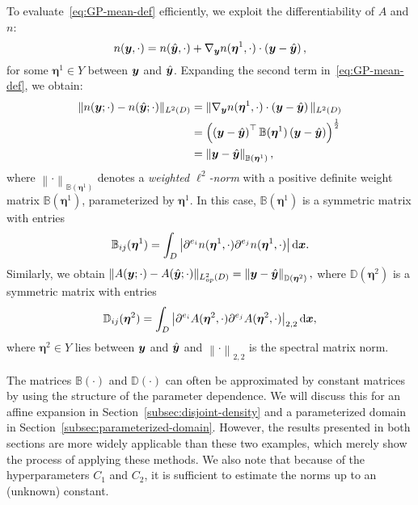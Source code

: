 To evaluate~\eqref{eq:GP-mean-def} efficiently, we exploit the differentiability of $A$ and $n$:
\begin{equation*}
    n({\bm{y}}, \cdot) = n(\hat{\bm{y}}, \cdot) + \nabla_{{\bm{y}}} n(\bm{\eta}^1, \cdot) \cdot \left( {\bm{y}} - \hat{\bm{y}} \right),
\end{equation*}
for some $\bm{\eta}^1\in Y$ between ${\bm{y}}$ and $\hat{\bm{y}}$.
Expanding the second term in~\eqref{eq:GP-mean-def}, we obtain:
\begin{align*}
    \|n({\bm{y}}; \cdot) - n(\hat{{\bm{y}}};\cdot)\|_{L^2(D)}&= \| \nabla_{{\bm{y}}} n(\bm{\eta}^1, \cdot) \cdot \left( {\bm{y}} - \hat{\bm{y}} \right) \|_{L^2(D)}\\
    &= \left( \left({\bm{y}} - \hat{\bm{y}} \right)^\top\mathbb{B}(\bm{\eta}^1)\left({\bm{y}} - \hat{\bm{y}} \right) \right)^{\frac{1}{2}}\\
    &= \left\| {\bm{y}}-\hat{\bm{y}} \right\|_{\mathbb{B}(\bm{\eta}^1)},
\end{align*}
where $\left\| \cdot \right\|_{\mathbb{B}(\bm{\eta}^1)}$ denotes a \emph{weighted $\ell^2$-norm} with a positive definite wei\-ght matrix $\mathbb{B}(\bm{\eta}^1)$, parameterized by $\bm{\eta}^1$.
In this case, $\mathbb{B}(\bm{\eta}^1)$ is a symmetric matrix with entries
\begin{equation}
    \mathbb{B}_{ij}(\bm{\eta}^1) = \int_D \left|  \partial^{e_i} n(\bm{\eta}^1, \cdot)\partial^{e_j} n(\bm{\eta}^1, \cdot)\right|  \mathrm{d}{{\bm{x}}} \label{eq:Bmatdef}.
\end{equation}
Similarly, we obtain $\|A({\bm{y}}; \cdot) - A(\hat{{\bm{y}}};\cdot)\|_{L^2_{op}(D)} = \left\| {\bm{y}}-\hat{\bm{y}} \right\|_{\mathbb{D}(\bm{\eta}^2)},$ where $\mathbb{D}(\bm{\eta}^2)$ is a symmetric matrix with entries
\begin{equation}
    \mathbb{D}_{ij}(\bm{\eta}^2) = \int_D\left|  \partial^{e_i} A(\bm{\eta}^2, \cdot)\partial^{e_j} A(\bm{\eta}{^2}, \cdot)\right|_{2,2}  \mathrm{d}{{\bm{x}}} \label{eq:Dmatdef},
\end{equation}
where $\bm{\eta}^2\in Y$ lies between ${\bm{y}}$ and $\hat{\bm{y}}$ and $\left\| \cdot \right\|_{2,2}$ is the spectral matrix norm.

The matrices $\mathbb{B}(\cdot)$ and $\mathbb{D}(\cdot)$ can often be approximated by constant matrices by using the structure of the parameter dependence.
We will discuss this for an affine expansion in Section~\ref{subsec:disjoint-density} and a parameterized domain in Section~\ref{subsec:parameterized-domain}.
However, the results presented in both sections are more widely applicable than these two examples, which merely show the process of applying these methods.
We also note that because of the hyperparameters $C_1$ and $C_2$, it is sufficient to estimate the norms up to an (unknown) constant.

